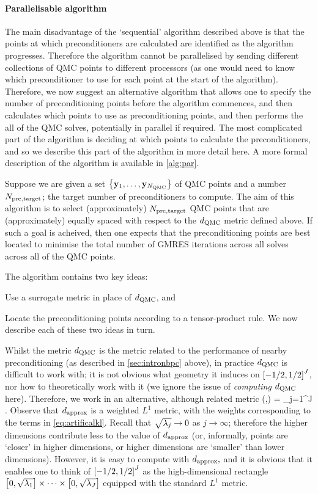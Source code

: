 \paragraph{Parallelisable algorithm} The main disadvantage of the `sequential' algorithm described above is that the points at which preconditioners are calculated are identified as the algorithm progresses. Therefore the algorithm cannot be parallelised by sending different collections of QMC points to different processors (as one would need to know which preconditioner to use for each point at the start of the algorithm). Therefore, we now suggest an alternative algorithm that allows one to specify the number of preconditioning points before the algorithm commences, and then calculates which points to use as preconditioning points, and then performs the all of the QMC solves, potentially in parallel if required. The most complicated part of the algorithm is deciding at which points to calculate the preconditioners, and so we describe this part of the algorithm in more detail here. A more formal description of the algorithm is available in \cref{alg:par}.

Suppose we are given a set $\set{\byo,\ldots,\byNQMC}$ of QMC points and a number $N_{\mathrm{pre,target}}$; the target number of preconditioners to compute. The aim of this algorithm is to select (approximately) $N_{\mathrm{pre,target}}$ QMC points that are (approximately) equally spaced with respect to the $d_{\mathrm{QMC}}$ metric defined above. If such a goal is acheived, then one expects that the preconditioning points are best located to minimise the total number of GMRES iterations across all solves across all of the QMC points.

The algorithm contains two key ideas:
\ben
  \item Use a surrogate metric in place of $d_{\mathrm{QMC}}$, and
\item Locate the preconditioning points according to a tensor-product rule.
  \een
  We now describe each of these two ideas in turn.

  Whilst the metric $d_{\mathrm{QMC}}$ is the metric related to the performance of nearby preconditioning (as described in \cref{sec:intronbpc} above), in practice $d_{\mathrm{QMC}}$ is difficult to work with; it is not obvious what geometry it induces on $\cube{J}$, nor how to theoretically work with it (we ignore the issue of \emph{computing} $d_{\mathrm{QMC}}$ here). Therefore, we work in an alternative, although related metric
  \beqs
\dapprox(\byo,\by) = \sum_{j=1}^{J} \sqrt{\lambdaj} .
\eeqs
Observe that $d_{\mathrm{approx}}$ is a weighted $L^1$ metric, with the weights corresponding to the terms in \cref{eq:artificalkl}. Recall that $\sqrt{\lambda_{j}} \rightarrow 0$ as $j \rightarrow \infty$; therefore the higher dimensions contribute less to the value of $d_{\mathrm{approx}}$ (or, informally, points are `closer' in higher dimensions, or higher dimensions are `smaller' than lower dimensions). However, it is easy to compute with $d_{\mathrm{approx}},$ and it is obvious that it enables one to think of $\cube{J}$ as the high-dimensional rectangle $\mleft[0,\sqrt{\lambdao}\mright]\times\cdots\times\mleft[0,\sqrt{\lambdaJ}\mright]$ equipped with the standard $L^1$ metric.

